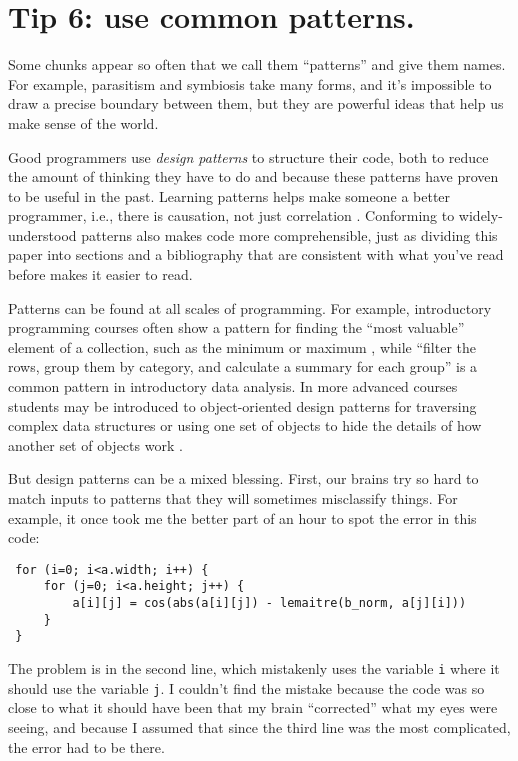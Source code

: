 \documentclass[10pt,letterpaper]{article}
\begin{document}
\section*{Tip 6: use common patterns.}

Some chunks appear so often that we call them ``patterns'' and give them names.
For example,
parasitism and symbiosis take many forms,
and it's impossible to draw a precise boundary between them,
but they are powerful ideas that help us make sense of the world.

Good programmers use \emph{design patterns} to structure their code,
both to reduce the amount of thinking they have to do
and because these patterns have proven to be useful in the past.
Learning patterns helps make someone a better programmer,
i.e.,
there is causation, not just correlation \cite{Tichy2010}.
Conforming to widely-understood patterns also makes code more comprehensible,
just as dividing this paper into sections and a bibliography
that are consistent with what you've read before
makes it easier to read.

Patterns can be found at all scales of programming.
For example,
introductory programming courses often show a pattern for finding the ``most valuable'' element of a collection,
such as the minimum or maximum \cite{Byckling2005},
while ``filter the rows, group them by category, and calculate a summary for each group''
is a common pattern in introductory data analysis.
In more advanced courses students may be introduced to object-oriented design patterns
for traversing complex data structures
or using one set of objects to hide the details of how another set of objects work \cite{Gamma1994,Freeman2020}.

But design patterns can be a mixed blessing.
First,
our brains try so hard to match inputs to patterns that they will sometimes misclassify things.
For example,
it once took me the better part of an hour to spot the error in this code:

\begin{lstlisting}
 for (i=0; i<a.width; i++) {
     for (j=0; i<a.height; j++) {
         a[i][j] = cos(abs(a[i][j]) - lemaitre(b_norm, a[j][i]))
     }
 }
\end{lstlisting}

The problem is in the second line,
which mistakenly uses the variable \texttt{i} where it should use the variable \texttt{j}.
I couldn't find the mistake because
the code was so close to what it should have been that my brain ``corrected'' what my eyes were seeing,
and because I assumed that since the third line was the most complicated,
the error had to be there.
\end{document}
